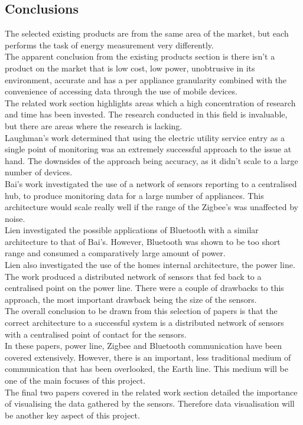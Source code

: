 \documentclass[preprint,12pt,3p]{elsarticle}
\begin{document}
\subsection{Conclusions}
The selected existing products are from the same area of the market, but each performs the task of energy measurement very differently.\\
The apparent conclusion from the existing products section is there isn't a product on the market that is low cost, low power, unobtrusive in its environment, accurate and has a per appliance granularity combined with the convenience of accessing data through the use of mobile devices.\\
The related work section highlights areas which a high concentration of research and time has been invested. The research conducted in this field is invaluable, but there are areas where the research is lacking.\\
Laughman's work determined that using the electric utility service entry as a single point of monitoring was an extremely successful approach to the issue at hand. The downsides of the approach being accuracy, as it didn't scale to a large number of devices.\\
Bai's work investigated the use of a network of sensors reporting to a centralised hub, to produce monitoring data for a large number of appliances. This architecture would scale really well if the range of the Zigbee's was unaffected by noise.\\
Lien investigated the possible applications of Bluetooth with a similar architecture to that of Bai's. However, Bluetooth was shown to be too short range and consumed a comparatively large amount of power.\\
Lien also investigated the use of the homes internal architecture, the power line. The work produced a distributed network of sensors that fed back to a centralised point on the power line. There were a couple of drawbacks to this approach, the most important drawback being the size of the sensors.\\
The overall conclusion to be drawn from this selection of papers is that the correct architecture to a successful system is a distributed network of sensors with a centralised point of contact for the sensors.\\
In these papers, power line, Zigbee and Bluetooth communication have been covered extensively. However, there is an important, less traditional medium of communication that has been overlooked, the Earth line. This medium will be one of the main focuses of this project.\\
The final two papers covered in the related work section detailed the importance of visualising the data gathered by the sensors. Therefore data visualisation will be another key aspect of this project.
\end{document}
